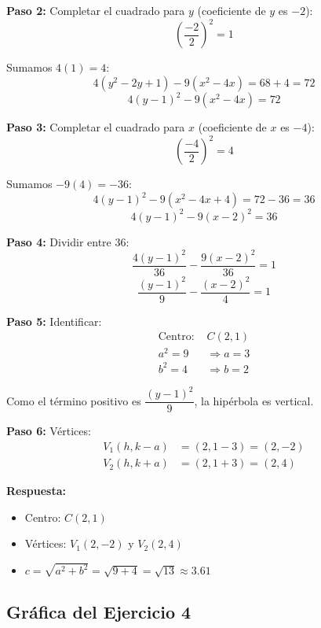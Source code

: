 \documentclass[12pt,a4paper]{article}
\begin{document}
	\textbf{Paso 2:} Completar el cuadrado para $y$ (coeficiente de $y$ es $-2$):
	\[
	\left(\frac{-2}{2}\right)^2=1
	\]

	Sumamos $4(1)=4$:
	\[
	4(y^2-2y+1)-9(x^2-4x)=68+4=72
	\]
	\[
	4(y-1)^2-9(x^2-4x)=72
	\]

	\textbf{Paso 3:} Completar el cuadrado para $x$ (coeficiente de $x$ es $-4$):
	\[
	\left(\frac{-4}{2}\right)^2=4
	\]

	Sumamos $-9(4)=-36$:
	\[
	4(y-1)^2-9(x^2-4x+4)=72-36=36
	\]
	\[
	4(y-1)^2-9(x-2)^2=36
	\]

	\textbf{Paso 4:} Dividir entre 36:
	\[
	\frac{4(y-1)^2}{36}-\frac{9(x-2)^2}{36}=1
	\]
	\[
	\frac{(y-1)^2}{9}-\frac{(x-2)^2}{4}=1
	\]

	\textbf{Paso 5:} Identificar:
	\[
	\begin{aligned}
		\text{Centro: }&C(2,1)\\
		a^2=9&\Rightarrow a=3\\
		b^2=4&\Rightarrow b=2
	\end{aligned}
	\]

	Como el término positivo es $\dfrac{(y-1)^2}{9}$, la hipérbola es vertical.

	\textbf{Paso 6:} Vértices:
	\[
	\begin{aligned}
		V_1(h,k-a)&=(2,1-3)=(2,-2)\\
		V_2(h,k+a)&=(2,1+3)=(2,4)
	\end{aligned}
	\]

	\textbf{Respuesta:}
	\begin{itemize}
		\item Centro: $\boxed{C(2,1)}$
		\item Vértices: $\boxed{V_1(2,-2)\text{ y }V_2(2,4)}$
		\item $c=\sqrt{a^2+b^2}=\sqrt{9+4}=\sqrt{13}\approx 3.61$
	\end{itemize}

	\subsection*{Gráfica del Ejercicio 4}
\end{document}
